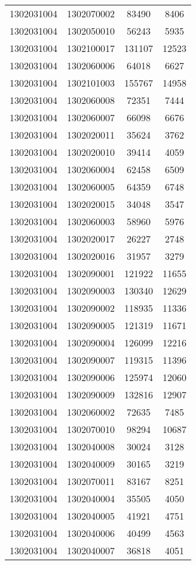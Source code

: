 \begin{longtable}{llcc}
1302031004 & 1302070002 & 83490 & 8406\\
1302031004 & 1302050010 & 56243 & 5935\\
1302031004 & 1302100017 & 131107 & 12523\\
1302031004 & 1302060006 & 64018 & 6627\\
1302031004 & 1302101003 & 155767 & 14958\\
1302031004 & 1302060008 & 72351 & 7444\\
1302031004 & 1302060007 & 66098 & 6676\\
1302031004 & 1302020011 & 35624 & 3762\\
1302031004 & 1302020010 & 39414 & 4059\\
1302031004 & 1302060004 & 62458 & 6509\\
1302031004 & 1302060005 & 64359 & 6748\\
1302031004 & 1302020015 & 34048 & 3547\\
1302031004 & 1302060003 & 58960 & 5976\\
1302031004 & 1302020017 & 26227 & 2748\\
1302031004 & 1302020016 & 31957 & 3279\\
1302031004 & 1302090001 & 121922 & 11655\\
1302031004 & 1302090003 & 130340 & 12629\\
1302031004 & 1302090002 & 118935 & 11336\\
1302031004 & 1302090005 & 121319 & 11671\\
1302031004 & 1302090004 & 126099 & 12216\\
1302031004 & 1302090007 & 119315 & 11396\\
1302031004 & 1302090006 & 125974 & 12060\\
1302031004 & 1302090009 & 132816 & 12907\\
1302031004 & 1302060002 & 72635 & 7485\\
1302031004 & 1302070010 & 98294 & 10687\\
1302031004 & 1302040008 & 30024 & 3128\\
1302031004 & 1302040009 & 30165 & 3219\\
1302031004 & 1302070011 & 83167 & 8251\\
1302031004 & 1302040004 & 35505 & 4050\\
1302031004 & 1302040005 & 41921 & 4751\\
1302031004 & 1302040006 & 40499 & 4563\\
1302031004 & 1302040007 & 36818 & 4051\\

\end{longtable}
